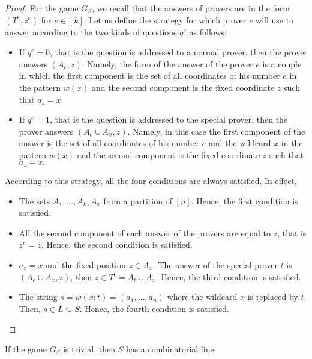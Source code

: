 \begin{proof}
For the game $G_S$, we recall that the answers of provers are in the form $(T^e, z^e)$ for $e \in [k].$  Let us define the  strategy for which prover $e$ will use to answer according to the two kinds of questions $q^e$ as follows: \begin{itemize}
\item If   $q^e=0$, that is the question is addressed to a normal prover, then the prover answers $(A_e,z).$ Namely, the form of the answer of the prover $e$ is a couple in which the first component  is the set of  all coordinates of his number $e$ in the pattern $w(x)$ and the second component is the fixed coordinate $z$ such that $a_z=x.$
\item If   $q^e=1$, that is the question is addressed to the special prover, then the prover answers $(A_e \cup A_x,z).$ Namely, in this case  the first component of the answer is the set of  all coordinates of his number $e$ and the wildcard $x$ in the pattern $w(x)$ and the second component is the fixed coordinate $z$ such that $a_z=x.$
\end{itemize}
According to this strategy, all the four conditions are always  satisfied. In effect,  \begin{itemize}
\item The sets $A_1, \ldots, A_k, A_x$ from a partition of $[n]$. Hence,  the  first condition is satisfied.
\item All the second component of each answer of the provers are equal to $z$, that is $z^e=z.$ Hence,  the second condition is satisfied.
\item $a_z=x$ and the fixed position $z \in A_x.$ The answer of the special prover $t$ is $(A_e \cup A_x,z)$, then $z \in T^t=A_t \cup A_x.$ Hence, the third condition is satisfied.
\item The string $\bar{s}=w(x;t)=(a_1,\ldots, a_n)$ where the wildcard $x$ is replaced by $t$. Then, $\bar{s} \in L \subseteq S.$ Hence, the fourth condition is satisfied.
\end{itemize}
\end{proof}

\begin{pro} If the game $G_S$ is trivial, then $S$ has a combinatorial line.	 \label{pr2}	\end{pro}

